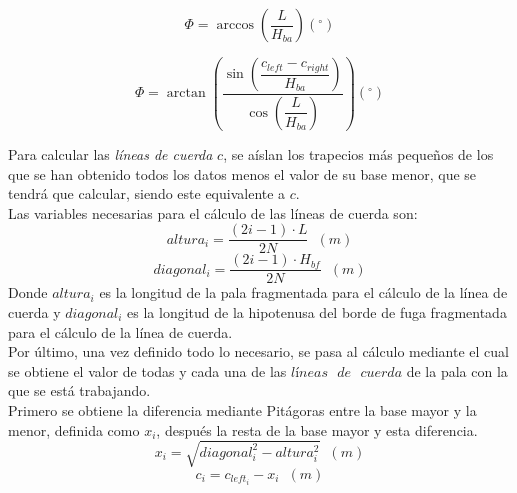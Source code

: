 \begin{equation}
 \Phi = \arccos{\left(\dfrac{L}{H_{ba}}\right)} (^{\circ})
\label{def_angulo_phi_2}
\end{equation}

\begin{equation}
 \Phi = \arctan{\left(\dfrac{\sin{\left(\dfrac{c_{left} - c_{right}}{H_{ba}}\right)}}{\cos{\left(\dfrac{L}{H_{ba}}\right)}}\right)} (^{\circ}) 
\label{def_angulo_phi_3}
\end{equation}


Para calcular las \textit{líneas de cuerda} $c$, se aíslan los trapecios más pequeños de los que se han obtenido todos los datos menos el valor de su base menor, que se tendrá que calcular, siendo este equivalente a $c$.\\

Las variables necesarias para el cálculo de las líneas de cuerda son:
\begin{equation}
 altura_i = \dfrac{(2i - 1) \cdot L}{2N} \hspace{7pt} (m)
\label{def_variables_fragmentadas1}
\end{equation}
\begin{equation}
     diagonal_i = \dfrac{(2i - 1) \cdot H_{bf}}{2N} \hspace{7pt} (m)
\label{def_variables_fragmentadas2}
\end{equation}
Donde $altura_i$ es la longitud de la pala fragmentada para el cálculo de la línea de cuerda y $diagonal_i$ es la longitud de la hipotenusa del borde de fuga fragmentada para el cálculo de la línea de cuerda.\\

Por último, una vez definido todo lo necesario, se pasa al cálculo mediante el cual se obtiene el valor de todas y cada una de las $líneas \text{ } de \text{ } cuerda$ de la pala con la que se está trabajando.\\

Primero se obtiene la diferencia mediante Pitágoras entre la base mayor y la menor, definida como $x_i$, después la resta de la base mayor y esta diferencia.
\begin{equation}
 x_i = \sqrt{diagonal_i^{2} - altura_i^{2}} \hspace{7pt} (m)
 \end{equation}
 \begin{equation}
 c_i = c_{left_i} - x_i \hspace{7pt} (m)
\label{def:chord_line}
\end{equation}

